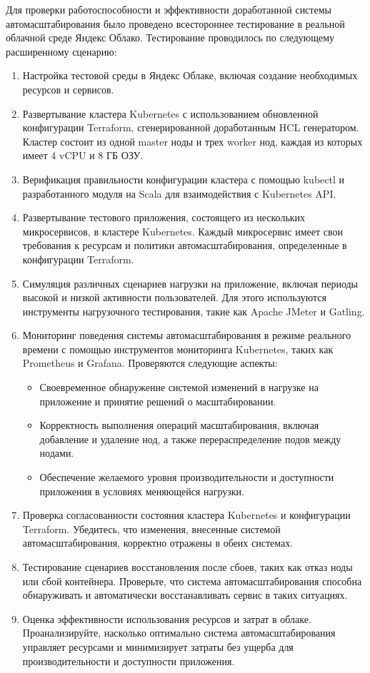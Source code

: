   Для проверки работоспособности и эффективности доработанной системы
автомасштабирования было проведено всестороннее тестирование в реальной облачной
среде Яндекс Облако. Тестирование проводилось по следующему расширенному
сценарию:
  
  \begin{enumerate}
    \item Настройка тестовой среды в Яндекс Облаке, включая создание необходимых
ресурсов и сервисов.
    \item Развертывание кластера Kubernetes с использованием обновленной
конфигурации Terraform, сгенерированной доработанным HCL генератором. Кластер
состоит из одной master ноды и трех worker нод, каждая из которых имеет 4 vCPU и
8 ГБ ОЗУ.
    \item Верификация правильности конфигурации кластера с помощью kubectl и
разработанного модуля на Scala для взаимодействия с Kubernetes API.
    \item Развертывание тестового приложения, состоящего из нескольких
микросервисов, в кластере Kubernetes. Каждый микросервис имеет свои требования к
ресурсам и политики автомасштабирования, определенные в конфигурации Terraform.
    \item Симуляция различных сценариев нагрузки на приложение, включая периоды
высокой и низкой активности пользователей. Для этого используются инструменты
нагрузочного тестирования, такие как Apache JMeter и Gatling.
    \item Мониторинг поведения системы автомасштабирования в режиме реального
времени с помощью инструментов мониторинга Kubernetes, таких как Prometheus и
Grafana. Проверяются следующие аспекты:
      \begin{itemize}
        \item Своевременное обнаружение системой изменений в нагрузке на
приложение и принятие решений о масштабировании.
        \item Корректность выполнения операций масштабирования, включая
добавление и удаление нод, а также перераспределение подов между нодами.
        \item Обеспечение желаемого уровня производительности и доступности
приложения в условиях меняющейся нагрузки.
      \end{itemize}
    \item Проверка согласованности состояния кластера Kubernetes и конфигурации
Terraform. Убедитесь, что изменения, внесенные системой автомасштабирования,
корректно отражены в обеих системах.
    \item Тестирование сценариев восстановления после сбоев, таких как отказ
ноды или сбой контейнера. Проверьте, что система автомасштабирования способна
обнаруживать и автоматически восстанавливать сервис в таких ситуациях.
    \item Оценка эффективности использования ресурсов и затрат в облаке.
Проанализируйте, насколько оптимально система автомасштабирования управляет
ресурсами и минимизирует затраты без ущерба для производительности и доступности
приложения.
   \end{enumerate}
   
